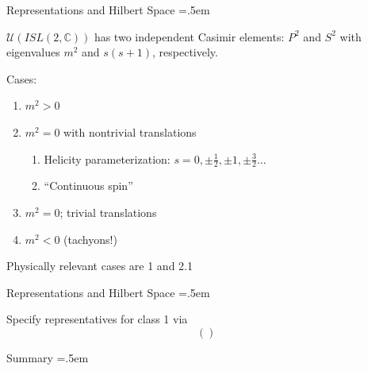\documentclass[xcolor={dvipsnames}]{beamer}
\let\olditemize=\itemize
\let\endolditemize=\enditemize
\renewenvironment{itemize}{\olditemize \itemsep=.5em }{\endolditemize}
\begin{document}
\begin{frame}{Representations and Hilbert Space}
    \begin{itemize}
        \item<2-> $\mathscr{U}(ISL(2, \mathbb{C}))$ has two independent Casimir elements: $P^2$ and $S^2$ with eigenvalues $m^2$ and $s(s+1)$, respectively.
        \item<3-> Cases:
        \begin{enumerate}
            \item<4-> $m^2 > 0$
            \item<5-> $m^2 = 0$ with nontrivial translations
            \begin{enumerate}
                \item<6-> Helicity parameterization: $s = 0, \pm \frac{1}{2}, \pm 1, \pm\frac{3}{2}\dots$
                \item<7-> ``Continuous spin''
            \end{enumerate}
            \item<6-> $m^2 = 0$; trivial translations
            \item<7-> $m^2 < 0$ (tachyons!)
        \end{enumerate}
        \item<8-> Physically relevant cases are 1 and 2.1
    \end{itemize}    
\end{frame}

\begin{frame}{Representations and Hilbert Space}
    \begin{itemize}
        \item<1-> Specify representatives for class 1 via \[ \left(\right) \] 
    \end{itemize}
\end{frame}

\begin{frame}{Summary}
    \begin{itemize}
        \item<2->
    \end{itemize}    
\end{frame}

%     
%     
\end{document}
